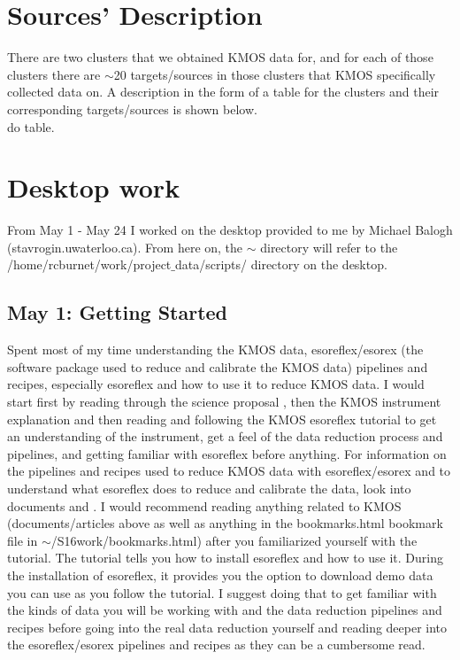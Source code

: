\documentclass[10pt,letterpaper]{article}
\begin{document}
\newpage

\section{Sources' Description}
There are two clusters that we obtained KMOS data for, and for each of those clusters there are $\sim$20 targets/sources in those clusters that KMOS specifically collected data on. A description in the form of a table for the clusters and their corresponding targets/sources is shown below.\\

do table.\\

\section{Desktop work}
From May 1 - May 24 I worked on the desktop provided to me by Michael Balogh (stavrogin.uwaterloo.ca). From here on, the $\sim$ directory will refer to the /home/rcburnet/work/project$\_$data/scripts/ directory on the desktop.
\subsection{May 1: Getting Started}
Spent most of my time understanding the KMOS data, esoreflex/esorex (the software package used to reduce and calibrate the KMOS data) pipelines and recipes, especially esoreflex and how to use it to reduce KMOS data. I would start first by reading through the science proposal \cite{Proposal}, then the KMOS instrument explanation \cite{KMOS instrument explanation} and then reading and following the KMOS esoreflex tutorial \cite{KMOS esoreflex tutorial} to get an understanding of the instrument, get a feel of the data reduction process and pipelines, and getting familiar with esoreflex before anything. For information on the pipelines and recipes used to reduce KMOS data with esoreflex/esorex and to understand what esoreflex does to reduce and calibrate the data, look into documents \cite{KMOS pipeline manual} and \cite{KMOS pipeline cookbook}. I would recommend reading anything related to KMOS (documents/articles above as well as anything in the bookmarks.html bookmark file in $\sim$/S16work/bookmarks.html) after you familiarized yourself with the tutorial. The tutorial tells you how to install esoreflex and how to use it. During the installation of esoreflex, it provides you the option to download demo data you can use as you follow the tutorial. I suggest doing that to get familiar with the kinds of data you will be working with and the data reduction pipelines and recipes before going into the real data reduction yourself and reading deeper into the esoreflex/esorex pipelines and recipes as they can be a cumbersome read.\\
\end{document}
